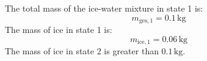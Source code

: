 The total mass of the ice-water mixture in state 1 is:  
\[
m_{\text{ges},1} = 0.1 \, \text{kg}
\]  
The mass of ice in state 1 is:  
\[
m_{\text{ice},1} = 0.06 \, \text{kg}
\]  
The mass of ice in state 2 is greater than \( 0.1 \, \text{kg} \).